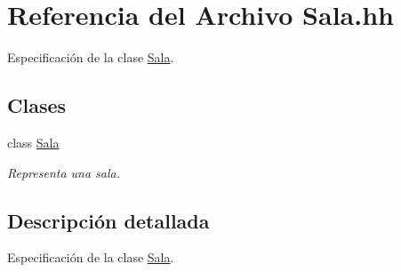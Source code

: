 \hypertarget{_sala_8hh}{}\section{Referencia del Archivo Sala.\+hh}
\label{_sala_8hh}


Especificación de la clase \hyperlink{class_sala}{Sala}.  


\subsection*{Clases}
\begin{DoxyCompactItemize}
\item 
class \hyperlink{class_sala}{Sala}
\begin{DoxyCompactList}\small\item\em Representa una sala. \end{DoxyCompactList}\end{DoxyCompactItemize}


\subsection{Descripción detallada}
Especificación de la clase \hyperlink{class_sala}{Sala}. 

